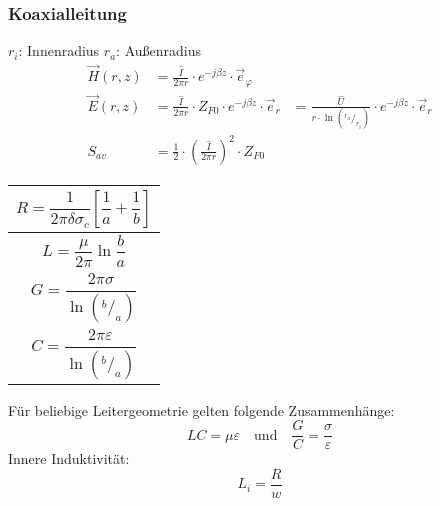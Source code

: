 %

\subsubsection{Koaxialleitung}
$ r_i $: Innenradius \quad $ r_a $: Außenradius
\begin{align*}
	\vec{H}(r, z)         & = \frac{\hat{I}}{2\pi r}\cdot e^{-j\beta z}\cdot\vec{e}_\varphi                   \\
	\vec{E}(r, z)         & = \frac{\hat{I}}{2\pi r}\cdot Z_{F0}\cdot e^{-j\beta z} \cdot\vec{e}_r
	& = \frac{\hat{U}}{r \cdot\ln{(^{r_a}/_{r_i})}}\cdot e^{-j\beta z}\cdot\vec{e}_r        \\
	S_{av} & = \frac{1}{2}\cdot\left( \frac{\hat{I}}{2\pi r}\right)^2\cdot Z_{F0}
\end{align*}

{\renewcommand*{\arraystretch}{0.2}
	\begin{tabularx}{0.5\columnwidth}{|X|}
		\hline
		\[R=\frac{1}{2\pi\delta\sigma_c}\left[\frac{1}{a}+\frac{1}{b}\right]\] \\
		\hline
		\[L=\frac{\mu}{2\pi}\ln\frac{b}{a}\]                                   \\
		\hline
		\[G=\frac{2\pi\sigma}{\ln(^b/_a)}\]                                    \\
		\hline
		\[C=\frac{2\pi\varepsilon}{\ln(^b/_a)}\]                               \\
		\hline
\end{tabularx}}



\vspace{1ex}
Für beliebige Leitergeometrie gelten folgende Zusammenhänge:
\[
LC = \mu\varepsilon \quad \text{und} \quad \frac{G}{C} = \frac{\sigma}{\varepsilon}
\]
Innere Induktivität:
\[
L_i = \frac{R}{w}
\]
\textbf{\color{red}{Leitungen gehen HIN und ZURÜCK!!!}\\
	\color{red}{Länge verdoppeln!!!}
}